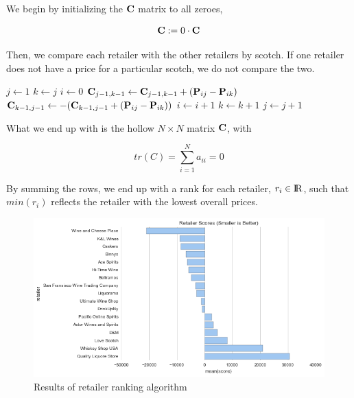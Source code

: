 We begin by initializing the $\mathbf{C}$ matrix to all zeroes,

\begin{equation*}
\begin{split}
    \mathbf{C} &:= 0 \cdot \mathbf{C}\\
\end{split}
\end{equation*}

Then, we compare each retailer with the other retailers by scotch. If one retailer does not have a price for a particular scotch, we do not compare the two. 

\pagebreak

\begin{algorithmic}
\State $j \gets 1$
    \State $k \gets j$
        \State $i \gets 0$
            \State $\mathbf{C}_{j - 1,k - 1} \gets \mathbf{C}_{j - 1,k - 1} + (\mathbf{P}_{ij} - \mathbf{P}_{ik})$
            \State $\mathbf{C}_{k - 1,j - 1} \gets - (\mathbf{C}_{k - 1,j - 1} + (\mathbf{P}_{ij} - \mathbf{P}_{ik}))$
            \State $i \gets i + 1$
        \EndFor
        \State $k \gets k + 1$
    \EndFor
    \State $j \gets j + 1$
\EndFor
\end{algorithmic}

What we end up with is the hollow $N \times N$ matrix $\mathbf{C}$, with 

\begin{equation*}
    tr(C) = \sum_{i = 1}^N a_{ii} = 0
\end{equation*}

By summing the rows, we end up with a rank for each retailer, $r_i \in {\rm I\!R}$, such that $min(r_i)$ reflects the retailer with the lowest overall prices.

\begin{figure}[htb]
\centering
\includegraphics[scale=.5]{retailer_rankings} 
\caption{Results of retailer ranking algorithm}
\label{fig:retailer_rankings} 
\end{figure}

